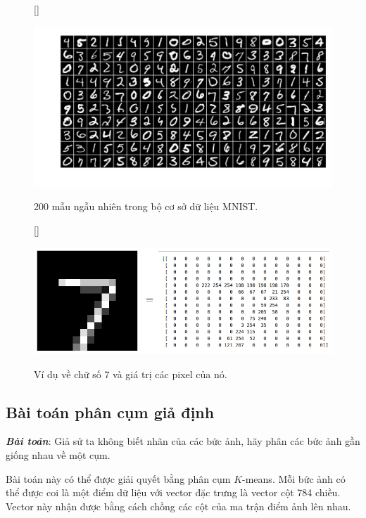 \begin{figure}[t]
    [\FBwidth]
    {\caption{ 
        200 mẫu ngẫu nhiên trong bộ cơ sở dữ liệu MNIST. 
    }
    \label{fig:5_mnist}}
    { %
    \includegraphics[width=.75\textwidth]{ebookML_src/src/kmeans/mnist_ex.png}
    }
\end{figure}
\begin{figure}[t]
    [\FBwidth]
    {\caption{ 
    Ví dụ về chữ số 7 và giá trị các pixel của nó. 
    }
    \label{fig:5_digit7}}
    { %
    \includegraphics[width=.75\textwidth]{Chapters/03_SimpleML/4_kmeans/digit_7.png}
    }
\end{figure}


\subsection{Bài toán phân cụm giả định}
\textit{\textbf{Bài toán}}: Giả sử ta không biết nhãn của các bức ảnh, hãy phân
các bức ảnh gần giống nhau về một cụm.

Bài toán này có thể được giải quyết bằng phân cụm $K$-means. Mỗi bức ảnh có thể
được coi là một điểm dữ liệu với vector đặc trưng là vector cột 784 chiều.
Vector này nhận được bằng cách chồng các cột của ma trận điểm ảnh lên nhau.



